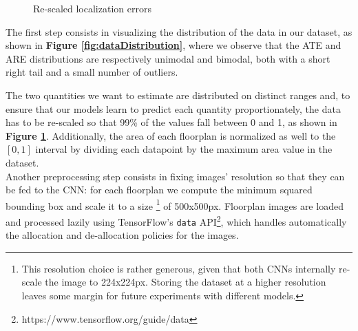 \begin{figure}[ht!]
    \centering
    \caption{Re-scaled localization errors}\label{fig:dataDistribution_scaled}
\end{figure}

\noindent
The first step consists in visualizing the distribution of the data in our dataset, as shown in \textbf{Figure \ref{fig:dataDistribution}}, where we observe that the ATE and ARE distributions are respectively unimodal and bimodal, both with a short right tail and a small number of outliers.

The two quantities we want to estimate are distributed on distinct ranges and, to ensure that our models learn to predict each quantity proportionately, the data has to be re-scaled so that 99\% of the values fall between 0 and 1, as shown in \textbf{Figure \ref{fig:dataDistribution_scaled}}. Additionally, the area of each floorplan is normalized as well to the $[0, 1]$ interval by dividing each datapoint by the maximum area value in the dataset.\\


\noindent
Another preprocessing step consists in fixing images' resolution so that they can be fed to the CNN: for each floorplan we compute the minimum squared bounding box and scale it to a size \footnote{This resolution choice is rather generous, given that both CNNs internally re-scale the image to 224x224px. Storing the dataset at a higher resolution leaves some margin for future experiments with different models.} of 500x500px. 
Floorplan images are loaded and processed lazily using TensorFlow's \texttt{data} API\footnote{https://www.tensorflow.org/guide/data}, which handles automatically the allocation and de-allocation policies for the images. 

